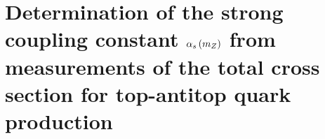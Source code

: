 \section{Determination of the strong coupling constant \texorpdfstring{$\alpha_s \left( m_Z \right) $}{alpha_s(mZ)} from measurements of the total cross section for top-antitop quark production}

